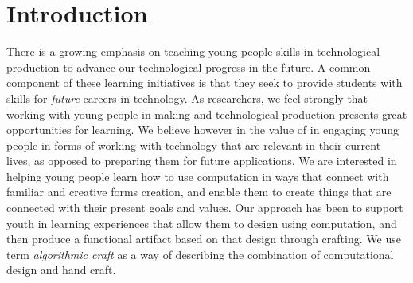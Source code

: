 \documentclass{sigchi}
\begin{document}


\section{Introduction}
There is a growing emphasis on teaching young people skills in technological production to advance our technological progress in the future. A common component of these learning initiatives is that they seek to provide students with skills for \textit{future} careers in technology. %
As researchers, we feel strongly that working with young people in making and technological production presents great opportunities for learning. We believe however in the value of in engaging young people in forms of working with technology that are relevant in their current lives, as opposed to preparing them for future applications. We are interested in helping young people learn how to use computation in ways that connect with familiar and creative forms creation, and enable them to create things that are connected with their present goals and values. Our approach has been to support youth in learning experiences that allow them to design using computation, and then produce a functional artifact based on that design through crafting. We use term \textit{algorithmic craft} as a way of describing the combination of computational design and hand craft. 
\end{document}
